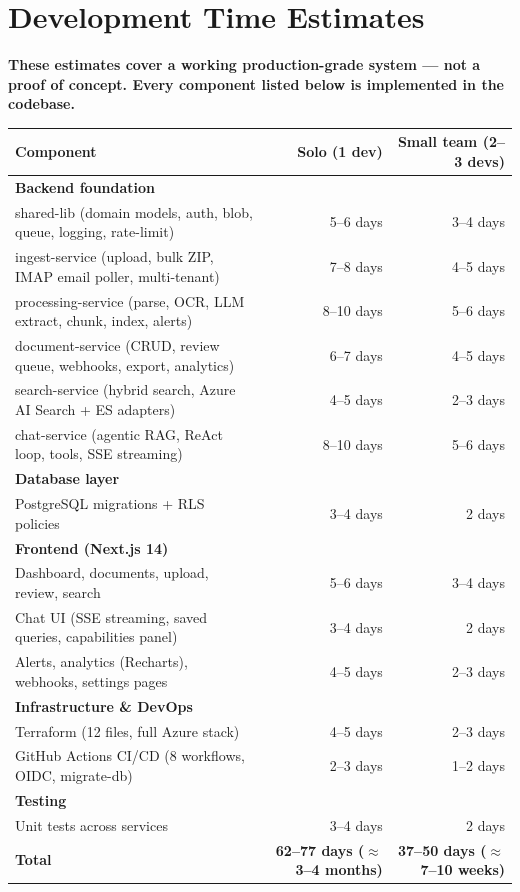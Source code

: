 \documentclass[12pt,a4paper]{article}
\newcommand{\keypoint}[1]{%
  \begin{tcolorbox}[colback=HighlightYellow, colframe=NordicGold,
    boxrule=1.2pt, arc=4pt, left=8pt, right=8pt, top=5pt, bottom=5pt]
    \faExclamationCircle\hspace{6pt}\textbf{#1}
  \end{tcolorbox}
}
\begin{document}
\newpage

\section{Development Time Estimates}

\keypoint{These estimates cover a working production-grade system — not a proof of concept. Every component listed below is implemented in the codebase.}

\begin{tabularx}{\textwidth}{Xrr}
\toprule
\textbf{Component} & \textbf{Solo (1 dev)} & \textbf{Small team (2–3 devs)} \\
\midrule
\textbf{Backend foundation} & & \\
\quad shared-lib (domain models, auth, blob, queue, logging, rate-limit) & 5–6 days & 3–4 days \\
\quad ingest-service (upload, bulk ZIP, IMAP email poller, multi-tenant) & 7–8 days & 4–5 days \\
\quad processing-service (parse, OCR, LLM extract, chunk, index, alerts) & 8–10 days & 5–6 days \\
\quad document-service (CRUD, review queue, webhooks, export, analytics) & 6–7 days & 4–5 days \\
\quad search-service (hybrid search, Azure AI Search + ES adapters) & 4–5 days & 2–3 days \\
\quad chat-service (agentic RAG, ReAct loop, tools, SSE streaming) & 8–10 days & 5–6 days \\
\midrule
\textbf{Database layer} & & \\
\quad 11 PostgreSQL migrations + RLS policies & 3–4 days & 2 days \\
\midrule
\textbf{Frontend (Next.js 14)} & & \\
\quad Dashboard, documents, upload, review, search & 5–6 days & 3–4 days \\
\quad Chat UI (SSE streaming, saved queries, capabilities panel) & 3–4 days & 2 days \\
\quad Alerts, analytics (Recharts), webhooks, settings pages & 4–5 days & 2–3 days \\
\midrule
\textbf{Infrastructure \& DevOps} & & \\
\quad Terraform (12 files, full Azure stack) & 4–5 days & 2–3 days \\
\quad GitHub Actions CI/CD (8 workflows, OIDC, migrate-db) & 2–3 days & 1–2 days \\
\midrule
\textbf{Testing} & & \\
\quad Unit tests across services & 3–4 days & 2 days \\
\midrule
\textbf{Total} & \textbf{62–77 days ($\approx$3–4 months)} & \textbf{37–50 days ($\approx$7–10 weeks)} \\
\bottomrule
\end{tabularx}
\end{document}
